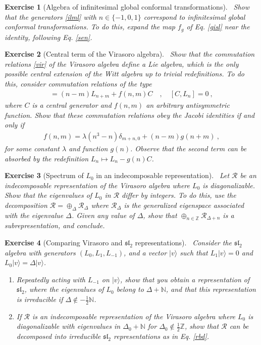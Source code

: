 \documentclass[12pt, a4paper, notitlepage, twoside]{report}
\numberwithin{equation}{section}
\theoremstyle{break}
\newtheorem{exo}{Exercise}[chapter]
\begin{document}
\begin{exo}[Algebra of infinitesimal global conformal transformations]
 ~\label{exomoz}
Show that the generators \eqref{ilml} with $n\in\{-1,0,1\}$ correspond to infinitesimal global conformal transformations.
To do this, expand the map $f_g$ of Eq. \eqref{gisl} near the identity, following Eq. \eqref{sen}.
\end{exo}


\begin{exo}[Central term of the Virasoro algebra]
~\label{exovir}
 Show that the commutation relations \eqref{vir} of the Virasoro algebra define a Lie algebra, which is the only possible central extension of the Witt algebra up to trivial redefinitions.
To do this, consider commutation relations of the type
\begin{align}
 [L_n,L_m] =(n-m)L_{n+m} + f(n,m) C  \quad , \quad [C,L_n]=0\ ,
\end{align}
where $C$ is a central generator and $f(n,m)$ an arbitrary antisymmetric function.
Show that these commutation relations obey the Jacobi identities if and only if 
\begin{align}
 f(n,m) = \lambda (n^3-n)\delta_{m+n,0} + (n-m)g(n+m)\ ,
\end{align}
for some constant $\lambda$ and function $g(n)$.
Observe that the second term can be absorbed by the redefinition $L_n\mapsto L_n-g(n)C$.
\end{exo}

\begin{exo}[Spectrum of $L_0$ in an indecomposable representation]
 ~\label{exodiffint}
 Let $\mathcal{R}$ be an indecomposable representation of the Virasoro algebra where $L_0$ is diagonalizable. 
Show that the eigenvalues of $L_0$ in  $\mathcal{R}$ differ by integers.
To do this, use the decomposition $\mathcal{R}=\oplus_\Delta \mathcal{R}_\Delta$ where $\mathcal{R}_\Delta$ is the generalized eigenspace associated with the eigenvalue $\Delta$.
Given any value of $\Delta$, show that  $\oplus_{n\in{\mathbb{Z}}} \mathcal{R}_{\Delta+n}$ is a subrepresentation, and conclude. 
\end{exo}

\begin{exo}[Comparing Virasoro and $\mathfrak{sl}_2$ representations]
 ~\label{exodis}
Consider the $\mathfrak{sl}_2$ algebra with generators $(L_0,L_1,L_{-1})$, and a vector $|v\rangle$ such that $L_1|v\rangle = 0 $ and $L_0|v\rangle = \Delta |v\rangle$.
\begin{enumerate}
 \item 
Repeatedly acting with $L_{-1}$ on $|v\rangle$, show that you obtain a representation of $\mathfrak{sl}_2$, where the eigenvalues of $L_0$ belong to $\Delta+{\mathbb{N}}$, and that this representation is irreducible if $\Delta\notin -\frac12 \mathbb{N}$.
\item
If $\mathcal{R}$ is an indecomposable representation of the Virasoro algebra where $L_0$ is diagonalizable with eigenvalues in $\Delta_0+\mathbb{N}$ for $\Delta_0\notin\frac12 \mathbb{Z}$, show that $\mathcal{R}$ can be decomposed into irreducible $\mathfrak{sl}_2$ representations as in Eq. \eqref{rbd}.
\end{enumerate}
\end{exo}
\end{document}

